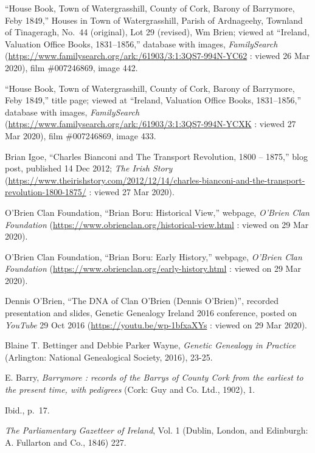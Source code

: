 \begin{thebibliography}{999}
	``House Book, Town of Watergrasshill, County of Cork, Barony of Barrymore, Feby 1849,'' Houses in Town of Watergrasshill, Parish of Ardnageehy, Townland of Tinageragh, No.\ 44 (original), Lot 29 (revised), Wm Brien; viewed at ``Ireland, Valuation Office Books, 1831--1856,'' database with images, \textit{FamilySearch} (\url{https://www.familysearch.org/ark:/61903/3:1:3QS7-994N-YC62} : viewed 26 Mar 2020), film \#007246869, image 442.
	
	``House Book, Town of Watergrasshill, County of Cork, Barony of Barrymore, Feby 1849,'' title page; viewed at ``Ireland, Valuation Office Books, 1831--1856,'' database with images, \textit{FamilySearch} (\url{https://www.familysearch.org/ark:/61903/3:1:3QS7-994N-YCXK} : viewed 27 Mar 2020), film \#007246869, image 433.
	
	Brian Igoe, ``Charles Bianconi and The Transport Revolution, 1800 -- 1875,'' blog post, published 14 Dec 2012; \textit{The Irish Story} (\url{https://www.theirishstory.com/2012/12/14/charles-bianconi-and-the-transport-revolution-1800-1875/} : viewed 27 Mar 2020).
	
	O'Brien Clan Foundation, ``Brian Boru: Historical View,'' webpage, \textit{O'Brien Clan Foundation} (\url{https://www.obrienclan.org/historical-view.html} : viewed on 29 Mar 2020).
	
	O'Brien Clan Foundation, ``Brian Boru: Early History,'' webpage, \textit{O'Brien Clan Foundation} (\url{https://www.obrienclan.org/early-history.html} : viewed on 29 Mar 2020).	
	
	Dennis O'Brien, ``The DNA of Clan O'Brien (Dennis O'Brien)'', recorded presentation and slides, Genetic Genealogy Ireland 2016 conference, posted on \textit{YouTube} 29 Oct 2016 (\url{https://youtu.be/wp-1bfxaXYs} : viewed on 29 Mar 2020).
	
	Blaine T. Bettinger and Debbie Parker Wayne, \textit{Genetic Genealogy in Practice} (Arlington: National Genealogical Society, 2016), 23-25.
	
	E. Barry, \textit{Barrymore : records of the Barrys of County Cork from the earliest to the present time, with pedigrees} (Cork: Guy and Co. Ltd., 1902), 1.
	
	Ibid., p.\ 17.
	
	\textit{The Parliamentary Gazetteer of Ireland}, Vol. 1 (Dublin, London, and Edinburgh: A. Fullarton and Co., 1846) 227.
	

\end{thebibliography}
